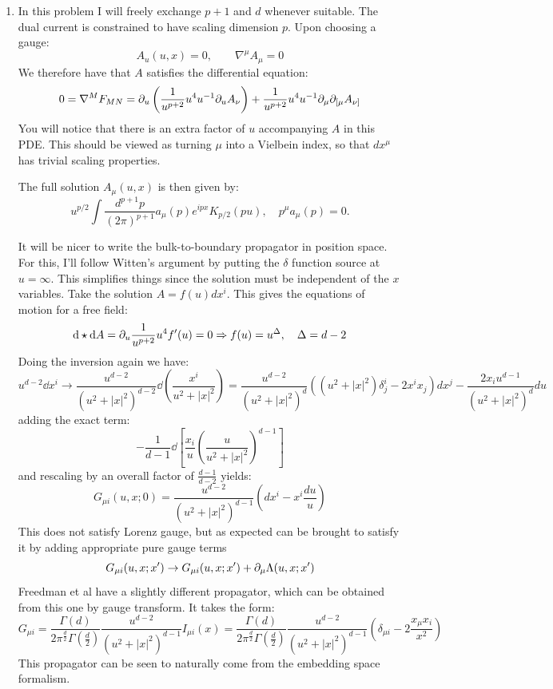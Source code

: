 \documentclass[11pt, class=article, crop=false]{standalone}
\begin{document}
\begin{enumerate}
	\item In this problem I will freely exchange $p+1$ and $d$ whenever suitable. The dual current is constrained to have scaling dimension $p$. Upon choosing a gauge:
	\[
		A_u(u, x) = 0, \qquad \nabla^\mu A_\mu = 0
	\]
	We therefore have that $A$ satisfies the differential equation:
	\[
		0 = \nabla^M F_{MN} = \partial_u \left(\frac{1}{u^{p+2}} u^4 u^{-1} \partial_u A_\nu \right) + \frac{1}{u^{p+2}} u^4 u^{-1} \partial_\mu \partial_{[\mu} A_{\nu]}
	\]
	You will notice that there is an extra factor of $u$ accompanying $A$ in this PDE. This should be viewed as turning $\mu$ into a Vielbein index, so that $dx^\mu$ has trivial scaling properties. 
	
	The full solution $A_\mu (u, x)$ is then given by:
	\[
		u^{p/2} \int \frac{d^{p+1} p}{(2\pi)^{p+1}} a_\mu (p) e^{i p x} K_{p/2}(p u), \quad p^\mu a_\mu(p) = 0.
	\]
	
	
	It will be nicer to write the bulk-to-boundary propagator in position space. For this, I'll follow Witten's argument by putting the $\delta$ function source at $u = \infty$. This simplifies things since the solution must be independent of the $x$ variables. Take the solution $A= f(u) dx^i$. This gives the equations of motion for a free field:
	\[
		\mathrm{d} \star \mathrm{d} A = \partial_u \frac{1}{u^{p+2}} u^4 f'(u) = 0 \Rightarrow f(u) = u^\Delta, \quad \Delta = d-2
	\]
	Doing the inversion again we have:
	\[
		u^{d-2} \dd x^i \to \frac{u^{d-2}}{(u^2 + |x|^2)^{d-2}} \dd\left(\frac{x^i}{u^2 + |x|^2} \right)=  \frac{u^{d-2}}{(u^2 + |x|^2)^{d}} \left((u^2 + |x|^2)\delta^i_j - 2 x^i x_j\right) dx^j - \frac{2 x_i u^{d-1}}{(u^2 + |x|^2)^{d}} du
	\]
	adding the exact term:
	\[
		- \frac{1}{d-1} \dd \left[\frac{x_i}{u} \left(\frac{u}{u^2 + |x|^2} \right)^{d-1} \right]
	\]
	and rescaling by an overall factor of $\frac{d-1}{d-2}$ yields:
	\begin{equation}\label{eq:vectorprop}
		G_{\mu i}(u, x; 0) = \frac{u^{d-2}}{(u^2 + |x|^2)^{d-1}} \left(dx^i - x^i \frac{du}{u} \right)
	\end{equation}
	This does not satisfy Lorenz gauge, but as expected can be brought to satisfy it by adding appropriate pure gauge terms
	\[
		G_{\mu i}(u, x; x') \to G_{\mu i}(u, x; x') + \partial_\mu \Lambda(u, x; x')
	\]
	Freedman et al have a slightly different propagator, which can be obtained from this one by gauge transform. It takes the form:
	\[
		G_{\mu i} = \frac{ \Gamma(d)}{2\pi^{\frac d2} \Gamma(\frac d2)} \frac{u^{d-2}}{(u^2 + |x|^2)^{d-1}} I_{\mu i}(x) 
		= \frac{ \Gamma(d)}{2\pi^{\frac d2} \Gamma(\frac d2)} \frac{u^{d-2}}{(u^2 + |x|^2)^{d-1}} \left(\delta_{\mu i} - 2 \frac{x_\mu x_i}{x^2} \right)
	\]
	This propagator can be seen to naturally come from the embedding space formalism. 
	

\end{enumerate}
\end{document}
